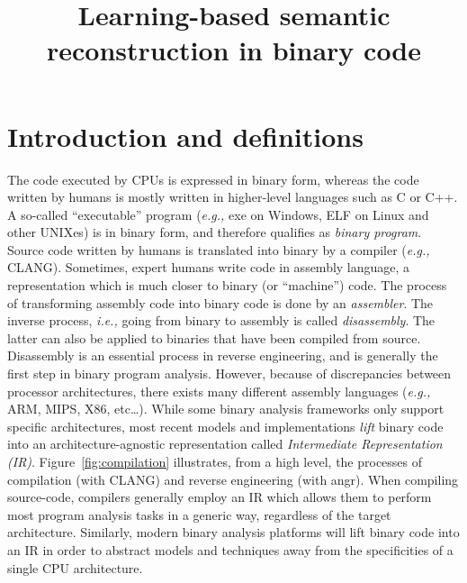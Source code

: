 \documentclass{article}
\begin{document}
\title{Learning-based semantic reconstruction in binary code}
\date{}
\maketitle


\section{Introduction and definitions}
The code executed by CPUs is expressed in binary form, whereas the code written by humans is mostly written in higher-level languages such as C or C++. A so-called ``executable'' program (\textit{e.g.,} exe on Windows, ELF on Linux and other UNIXes) is in binary form, and therefore qualifies as \emph{binary program}. Source code written by humans is translated into binary by a compiler (\textit{e.g.,} CLANG). Sometimes, expert humans write code in assembly language, a representation which is much closer to binary (or ``machine'') code. The process of transforming assembly code into binary code is done by an \emph{assembler}. The inverse process, \textit{i.e.,} going from binary to assembly is called \emph{disassembly}. The latter can also be applied to binaries that have been compiled from source. Disassembly is an essential process in reverse engineering, and is generally the first step in binary program analysis. However, because of discrepancies between processor architectures, there exists many different assembly languages (\textit{e.g.,} ARM, MIPS, X86, etc\ldots). While some binary analysis frameworks only support specific architectures, most  recent models and implementations \emph{lift} binary code into an architecture-agnostic representation called \emph{Intermediate Representation (IR)}.
Figure~\ref{fig:compilation} illustrates, from a high level, the processes of compilation (with CLANG) and reverse engineering (with angr). When compiling source-code, compilers generally employ an IR which allows them to perform most program analysis tasks in a generic way, regardless of the target architecture. Similarly, modern binary analysis platforms will lift binary code into an IR in order to abstract models and techniques away from the specificities of a single CPU architecture.
\end{document}
